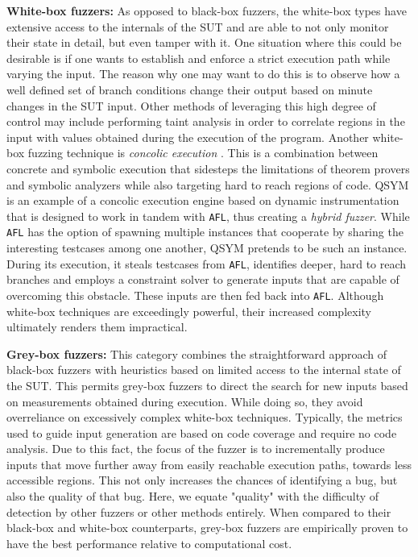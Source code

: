 \textbf{White-box fuzzers:} As opposed to black-box fuzzers, the white-box types have extensive access to the internals of the SUT and are able to not only monitor their state in detail, but even tamper with it. One situation where this could be desirable is if one wants to establish and enforce a strict execution path while varying the input. The reason why one may want to do this is to observe how a well defined set of branch conditions change their output based on minute changes in the SUT input. Other methods of leveraging this high degree of control may include performing taint analysis \cite{ganesh2009taint} in order to correlate regions in the input with values obtained during the execution of the program. Another white-box fuzzing technique is \textit{concolic execution} \cite{sen2007concolic}. This is a combination between concrete and symbolic execution that sidesteps the limitations of theorem provers and symbolic analyzers while also targeting hard to reach regions of code. QSYM \cite{yun2018qsym} is an example of a concolic execution engine based on dynamic instrumentation that is designed to work in tandem with \texttt{AFL}, thus creating a \textit{hybrid fuzzer}. While \texttt{AFL} has the option of spawning multiple instances that cooperate by sharing the interesting testcases among one another, QSYM pretends to be such an instance. During its execution, it steals testcases from \texttt{AFL}, identifies deeper, hard to reach branches and employs a constraint solver to generate inputs that are capable of overcoming this obstacle. These inputs are then fed back into \texttt{AFL}. Although white-box techniques are exceedingly powerful, their increased complexity ultimately renders them impractical.

\textbf{Grey-box fuzzers:} This category combines the straightforward approach of black-box fuzzers with heuristics based on limited access to the internal state of the SUT. This permits grey-box fuzzers to direct the search for new inputs based on measurements obtained during execution. While doing so, they avoid overreliance on excessively complex white-box techniques. Typically, the metrics used to guide input generation are based on code coverage \cite{bohme2016coverage,pham2019smart} and require no code analysis. Due to this fact, the focus of the fuzzer is to incrementally produce inputs that move further away from easily reachable execution paths, towards less accessible regions. This not only increases the chances of identifying a bug, but also the quality of that bug. Here, we equate "quality" with the difficulty of detection by other fuzzers or other methods entirely. When compared to their black-box and white-box counterparts, grey-box fuzzers are empirically proven to have the best performance relative to computational cost.

